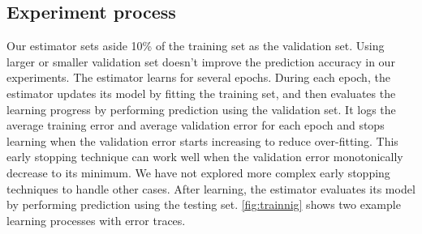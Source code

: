 \documentclass[twocolumn]{article}
\begin{document}
\subsection{Experiment process}
Our estimator sets aside 10\% of the training set as the validation set.
Using larger or smaller validation set doesn't improve the prediction accuracy 
in our experiments.
The estimator learns for several epochs.
During each epoch, the estimator updates its model by fitting the training set, 
and then evaluates the learning progress by performing prediction using the 
validation set.
It logs the average training error and average validation error for each epoch 
and stops learning when the validation error starts increasing to reduce 
over-fitting.
This early stopping technique can work well when the validation error 
monotonically decrease to its minimum.
We have not explored more complex early stopping techniques to handle other 
cases.
After learning, the estimator evaluates its model by performing prediction 
using the testing set.
\autoref{fig:trainnig} shows two example learning processes with error traces.
\end{document}

